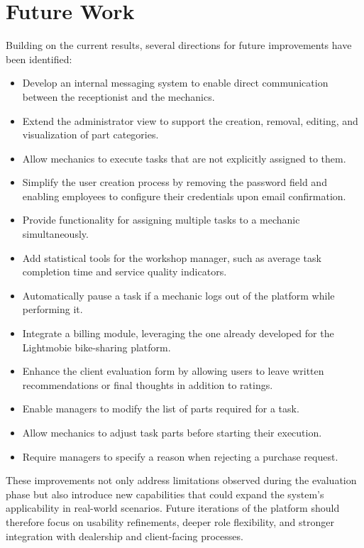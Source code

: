 \section{Future Work}

Building on the current results, several directions for future improvements have been identified:

\begin{itemize}
    \item Develop an internal messaging system to enable direct communication between the receptionist and the mechanics.
    \item Extend the administrator view to support the creation, removal, editing, and visualization of part categories.
    \item Allow mechanics to execute tasks that are not explicitly assigned to them.
    \item Simplify the user creation process by removing the password field and enabling employees to configure their credentials upon email confirmation.
    \item Provide functionality for assigning multiple tasks to a mechanic simultaneously.
    \item Add statistical tools for the workshop manager, such as average task completion time and service quality indicators.
    \item Automatically pause a task if a mechanic logs out of the platform while performing it.
    \item Integrate a billing module, leveraging the one already developed for the Lightmobie bike-sharing platform.
    \item Enhance the client evaluation form by allowing users to leave written recommendations or final thoughts in addition to ratings.
    \item Enable managers to modify the list of parts required for a task.
    \item Allow mechanics to adjust task parts before starting their execution.
    \item Require managers to specify a reason when rejecting a purchase request.
\end{itemize}

These improvements not only address limitations observed during the evaluation phase but also introduce new capabilities that could expand the system's applicability in real-world scenarios. Future iterations of the platform should therefore focus on usability refinements, deeper role flexibility, and stronger integration with dealership and client-facing processes.
 